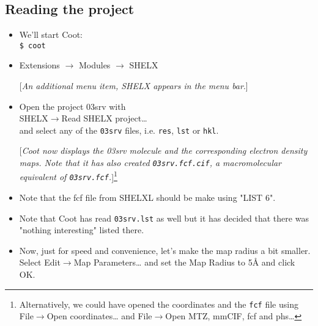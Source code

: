 \documentclass{article}
\begin{document}
\subsection{Reading the project}
\begin{itemize}
\item We'll start Coot: \\\texttt{\$ coot}


\item \textsf{Extensions $\rightarrow$ Modules $\rightarrow$ SHELX}

  [\textsl{An additional menu item, SHELX appears in the menu bar}.]

\item Open the project 03srv with\\\textsf{SHELX$\to$Read SHELX
    project\ldots}\\and select any of the \texttt{03srv} files, i.e.
  \texttt{res}, \texttt{lst} or \texttt{hkl}.

  [\textsl{Coot now displays the 03srv molecule and the corresponding
    electron density maps. Note that it has also created
    \texttt{03srv.fcf.cif}, a macromolecular equivalent of
    \texttt{03srv.fcf}.}]\footnote{Alternatively, we could have opened
    the coordinates and the \texttt{fcf} file
    using\\\textsf{File$\to$Open coordinates\ldots} and
    \textsf{File$\to$Open MTZ, mmCIF, fcf and phs\ldots}}

\item Note that the fcf file from SHELXL should be make using "LIST
  6".

\item Note that Coot has read \texttt{03srv.lst} as well but it has
  decided that there was "nothing interesting" listed there.

\item Now, just for speed and convenience, let's make the map radius a
  bit smaller. Select \textsf{Edit$\to$Map Parameters\ldots} and set
  the Map Radius to 5{\AA} and click \textsf{OK}.
\end{itemize}
\end{document}
